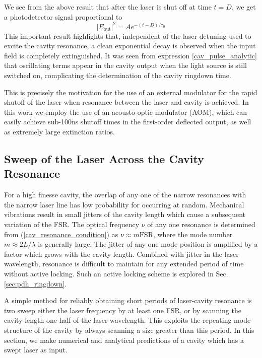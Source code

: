 We see from the above result that after the laser is shut off at time $t=D$, we get a photodetector signal proportional to
\begin{equation}
	\left|E_\mathrm{out}\right|^2 = A e^{-(t-D)/\tau_0}
\end{equation}
This important result highlights that, independent of the laser detuning used to excite the cavity resonance, a clean exponential decay is observed when the input field is completely extinguished. It was seen from expression \ref{cav_pulse_analytic} that oscillating terms appear in the cavity output when the light source is still switched on, complicating the determination of the cavity ringdown time.

This is precisely the motivation for the use of an external modulator for the rapid shutoff of the laser \cite{cw_crds_ROMANINI} when resonance between the laser and cavity is achieved. In this work we employ the use of an acousto-optic modulator (AOM), which can easily achieve sub-100ns shutoff times in the first-order deflected output, as well as extremely large extinction ratios.

\subsection{Sweep of the Laser Across the Cavity Resonance} \label{sec:cav_laser_sweep}
For a high finesse cavity, the overlap of any one of the narrow resonances with the narrow laser line has low probability for occurring at random. Mechanical vibrations result in small jitters of the cavity length which cause a subsequent variation of the FSR. The optical frequency $\nu$ of any one resonance is determined from (\ref{cav_resonance_condition}) as $\nu \approx m\mathrm{FSR}$, where the mode number $m\approx2L/\lambda$ is generally large. The jitter of any one mode position is amplified by a factor which grows with the cavity length. Combined with jitter in the laser wavelength, resonance is difficult to maintain for any extended period of time without active locking. Such an active locking scheme is explored in Sec. \ref{sec:pdh_ringdown}.

A simple method for reliably obtaining short periods of laser-cavity resonance is two sweep either the laser frequency by at least one FSR, or by scanning the cavity length one-half of the laser wavelength. This exploits the repeating mode structure of the cavity by always scanning a size greater than this period. In this section, we make numerical and analytical predictions of a cavity which has a swept laser as input.

